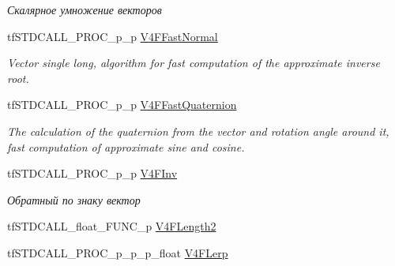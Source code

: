 \begin{DoxyCompactItemize}
\begin{DoxyCompactList}\small\item\em Скалярное умножение векторов \end{DoxyCompactList}\item 
\hypertarget{structs_functions_vector_c_p_u_a68e10d1e4b51279ce01964536d75d114}{tf\-S\-T\-D\-C\-A\-L\-L\-\_\-\-P\-R\-O\-C\-\_\-p\-\_\-p \hyperlink{structs_functions_vector_c_p_u_a68e10d1e4b51279ce01964536d75d114}{V4\-F\-Fast\-Normal}}\label{structs_functions_vector_c_p_u_a68e10d1e4b51279ce01964536d75d114}

\begin{DoxyCompactList}\small\item\em Vector single long, algorithm for fast computation of the approximate inverse root. \end{DoxyCompactList}\item 
\hypertarget{structs_functions_vector_c_p_u_a692c4c3c1af9db5062f4e5432eadb6c2}{tf\-S\-T\-D\-C\-A\-L\-L\-\_\-\-P\-R\-O\-C\-\_\-p\-\_\-p \hyperlink{structs_functions_vector_c_p_u_a692c4c3c1af9db5062f4e5432eadb6c2}{V4\-F\-Fast\-Quaternion}}\label{structs_functions_vector_c_p_u_a692c4c3c1af9db5062f4e5432eadb6c2}

\begin{DoxyCompactList}\small\item\em The calculation of the quaternion from the vector and rotation angle around it, fast computation of approximate sine and cosine. \end{DoxyCompactList}\item 
\hypertarget{structs_functions_vector_c_p_u_aba681229cb2e259b568ab721a6d0a91a}{tf\-S\-T\-D\-C\-A\-L\-L\-\_\-\-P\-R\-O\-C\-\_\-p\-\_\-p \hyperlink{structs_functions_vector_c_p_u_aba681229cb2e259b568ab721a6d0a91a}{V4\-F\-Inv}}\label{structs_functions_vector_c_p_u_aba681229cb2e259b568ab721a6d0a91a}

\begin{DoxyCompactList}\small\item\em Обратный по знаку вектор \end{DoxyCompactList}\item 
tf\-S\-T\-D\-C\-A\-L\-L\-\_\-float\-\_\-\-F\-U\-N\-C\-\_\-p \hyperlink{structs_functions_vector_c_p_u_a0f63d9b16b384ba993cfb3ba0dbb16cb}{V4\-F\-Length2}
\item 
\hypertarget{structs_functions_vector_c_p_u_a6ce7f24b84a5459620e1f082c458ee51}{tf\-S\-T\-D\-C\-A\-L\-L\-\_\-\-P\-R\-O\-C\-\_\-p\-\_\-p\-\_\-p\-\_\-float \hyperlink{structs_functions_vector_c_p_u_a6ce7f24b84a5459620e1f082c458ee51}{V4\-F\-Lerp}}\label{structs_functions_vector_c_p_u_a6ce7f24b84a5459620e1f082c458ee51}


\end{DoxyCompactItemize}
